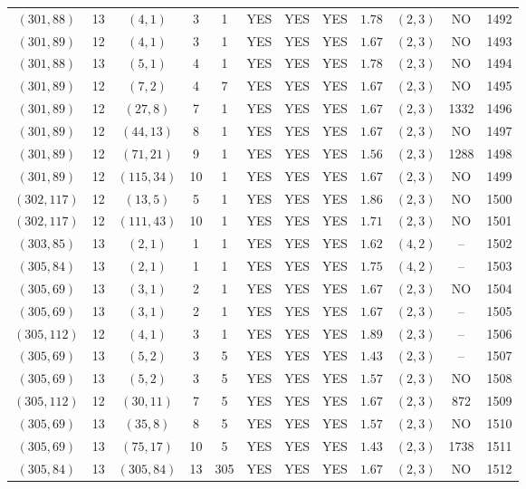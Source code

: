 \begin{longtable}{|c|c|c|c|c|c|c|c|c|c|c|c|}
$(301,88)$ & 13 & $(4,1)$ & 3 & 1 & YES & YES & YES & $1.78$ & $(2,3)$ & NO & 1492\\
$(301,89)$ & 12 & $(4,1)$ & 3 & 1 & YES & YES & YES & $1.67$ & $(2,3)$ & NO & 1493\\
$(301,88)$ & 13 & $(5,1)$ & 4 & 1 & YES & YES & YES & $1.78$ & $(2,3)$ & NO & 1494\\
$(301,89)$ & 12 & $(7,2)$ & 4 & 7 & YES & YES & YES & $1.67$ & $(2,3)$ & NO & 1495\\
$(301,89)$ & 12 & $(27,8)$ & 7 & 1 & YES & YES & YES & $1.67$ & $(2,3)$ & 1332 & 1496\\
$(301,89)$ & 12 & $(44,13)$ & 8 & 1 & YES & YES & YES & $1.67$ & $(2,3)$ & NO & 1497\\
$(301,89)$ & 12 & $(71,21)$ & 9 & 1 & YES & YES & YES & $1.56$ & $(2,3)$ & 1288 & 1498\\
$(301,89)$ & 12 & $(115,34)$ & 10 & 1 & YES & YES & YES & $1.67$ & $(2,3)$ & NO & 1499\\
$(302,117)$ & 12 & $(13,5)$ & 5 & 1 & YES & YES & YES & $1.86$ & $(2,3)$ & NO & 1500\\
$(302,117)$ & 12 & $(111,43)$ & 10 & 1 & YES & YES & YES & $1.71$ & $(2,3)$ & NO & 1501\\
$(303,85)$ & 13 & $(2,1)$ & 1 & 1 & YES & YES & YES & $1.62$ & $(4,2)$ & -- & 1502\\
$(305,84)$ & 13 & $(2,1)$ & 1 & 1 & YES & YES & YES & $1.75$ & $(4,2)$ & -- & 1503\\
$(305,69)$ & 13 & $(3,1)$ & 2 & 1 & YES & YES & YES & $1.67$ & $(2,3)$ & NO & 1504\\
$(305,69)$ & 13 & $(3,1)$ & 2 & 1 & YES & YES & YES & $1.67$ & $(2,3)$ & -- & 1505\\
$(305,112)$ & 12 & $(4,1)$ & 3 & 1 & YES & YES & YES & $1.89$ & $(2,3)$ & -- & 1506\\
$(305,69)$ & 13 & $(5,2)$ & 3 & 5 & YES & YES & YES & $1.43$ & $(2,3)$ & -- & 1507\\
$(305,69)$ & 13 & $(5,2)$ & 3 & 5 & YES & YES & YES & $1.57$ & $(2,3)$ & NO & 1508\\
$(305,112)$ & 12 & $(30,11)$ & 7 & 5 & YES & YES & YES & $1.67$ & $(2,3)$ & 872 & 1509\\
$(305,69)$ & 13 & $(35,8)$ & 8 & 5 & YES & YES & YES & $1.57$ & $(2,3)$ & NO & 1510\\
$(305,69)$ & 13 & $(75,17)$ & 10 & 5 & YES & YES & YES & $1.43$ & $(2,3)$ & 1738 & 1511\\
$(305,84)$ & 13 & $(305,84)$ & 13 & 305 & YES & YES & YES & $1.67$ & $(2,3)$ & NO & 1512\\

\end{longtable}
